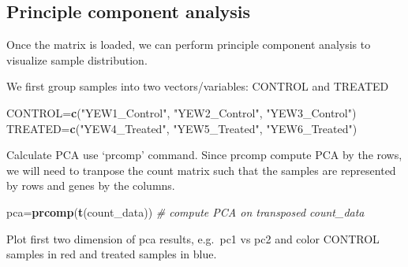 \documentclass[]{article}
\newenvironment{Shaded}{\begin{snugshade}}{\end{snugshade}}
\newcommand{\KeywordTok}[1]{\textcolor[rgb]{0.13,0.29,0.53}{\textbf{#1}}}
\newcommand{\DataTypeTok}[1]{\textcolor[rgb]{0.13,0.29,0.53}{#1}}
\newcommand{\DecValTok}[1]{\textcolor[rgb]{0.00,0.00,0.81}{#1}}
\newcommand{\StringTok}[1]{\textcolor[rgb]{0.31,0.60,0.02}{#1}}
\newcommand{\CommentTok}[1]{\textcolor[rgb]{0.56,0.35,0.01}{\textit{#1}}}
\newcommand{\OperatorTok}[1]{\textcolor[rgb]{0.81,0.36,0.00}{\textbf{#1}}}
\newcommand{\NormalTok}[1]{#1}
\begin{document}
\subsection{Principle component
analysis}\label{principle-component-analysis}

Once the matrix is loaded, we can perform principle component analysis
to visualize sample distribution.

We first group samples into two vectors/variables: CONTROL and TREATED

\begin{Shaded}
\begin{Highlighting}[]
\NormalTok{CONTROL=}\KeywordTok{c}\NormalTok{(}\StringTok{"YEW1_Control"}\NormalTok{, }\StringTok{"YEW2_Control"}\NormalTok{, }\StringTok{"YEW3_Control"}\NormalTok{)}
\NormalTok{TREATED=}\KeywordTok{c}\NormalTok{(}\StringTok{"YEW4_Treated"}\NormalTok{, }\StringTok{"YEW5_Treated"}\NormalTok{, }\StringTok{"YEW6_Treated"}\NormalTok{)}
\end{Highlighting}
\end{Shaded}

Calculate PCA use `prcomp' command. Since prcomp compute PCA by the
rows, we will need to tranpose the count matrix such that the samples
are represented by rows and genes by the columns.

\begin{Shaded}
\begin{Highlighting}[]
\NormalTok{pca=}\KeywordTok{prcomp}\NormalTok{(}\KeywordTok{t}\NormalTok{(count_data))        }\CommentTok{# compute PCA on transposed count_data}
\end{Highlighting}
\end{Shaded}

Plot first two dimension of pca results, e.g.~pc1 vs pc2 and color
CONTROL samples in red and treated samples in blue.

\begin{Shaded}
\end{Shaded}
\end{document}
